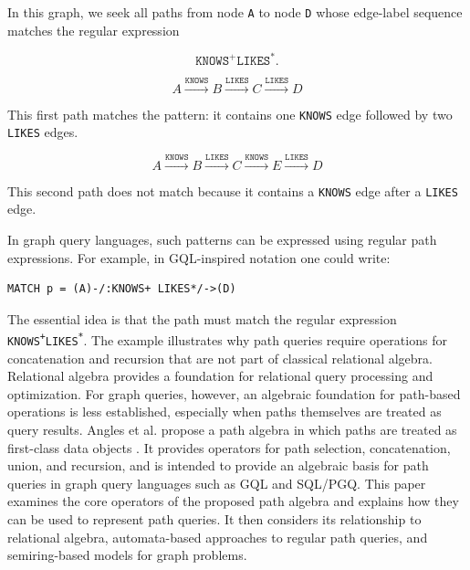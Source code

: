 In this graph, we seek all paths from node \texttt{A} to node \texttt{D} whose edge-label sequence matches the regular expression

\[
\texttt{KNOWS}^{+}\texttt{LIKES}^{*}.
\]

\[
A \xrightarrow{\texttt{KNOWS}} B
\xrightarrow{\texttt{LIKES}} C
\xrightarrow{\texttt{LIKES}} D
\]

This first path matches the pattern: it contains one \texttt{KNOWS} edge followed by two \texttt{LIKES} edges.

\[
A \xrightarrow{\texttt{KNOWS}} B
\xrightarrow{\texttt{LIKES}} C
\xrightarrow{\texttt{KNOWS}} E
\xrightarrow{\texttt{LIKES}} D
\]

This second path does not match because it contains a \texttt{KNOWS} edge after a \texttt{LIKES} edge.

In graph query languages, such patterns can be expressed using regular path expressions. For example, in GQL-inspired notation one could write:

\begin{Verbatim}
MATCH p = (A)-/:KNOWS+ LIKES*/->(D)
\end{Verbatim}

The essential idea is that the path must match the regular expression \texttt{KNOWS\textsuperscript{+}LIKES\textsuperscript{*}}. The example illustrates why path queries require operations for concatenation and recursion that are not part of classical relational algebra.
Relational algebra provides a foundation for relational query processing and optimization. For graph queries, however, an algebraic foundation for path-based operations is less established, especially when paths themselves are treated as query results.
Angles et al. propose a path algebra in which paths are treated as first-class data objects \cite{angles2024path}. It provides operators for path selection, concatenation, union, and recursion, and is intended to provide an algebraic basis for path queries in graph query languages such as GQL and SQL/PGQ.
This paper examines the core operators of the proposed path algebra and explains how they can be used to represent path queries. It then considers its relationship to relational algebra, automata-based approaches to regular path queries, and semiring-based models for graph problems.